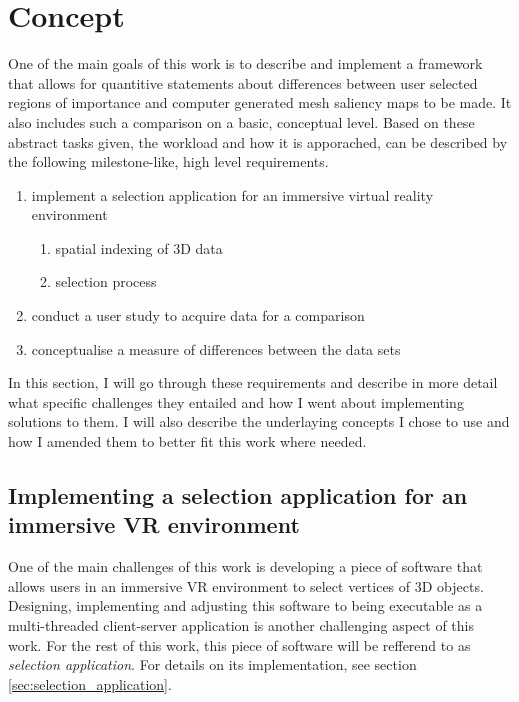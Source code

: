 \chapter{Concept}
\label{sec:concept}

One of the main goals of this work is to describe and implement a framework that allows for quantitive statements about differences between user selected regions of importance and computer generated mesh saliency maps to be made. It also includes such a comparison on a basic, conceptual level. Based on these abstract tasks given, the workload and how it is apporached, can be described by the following milestone-like, high level requirements.

\begin{enumerate}
	\item implement a selection application for an immersive virtual reality environment
	\begin{enumerate}
		\item spatial indexing of 3D data
		\item selection process
	\end{enumerate}
	\item conduct a user study to acquire data for a comparison
	\item conceptualise a measure of differences between the data sets
\end{enumerate}

In this section, I will go through these requirements and describe in more detail what specific challenges they entailed and how I went about implementing solutions to them. I will also describe the underlaying concepts I chose to use and how I amended them to better fit this work where needed.

	\section {Implementing a selection application for an immersive VR environment}
	\label{sec:implementing_selection_application_v2c}
One of the main challenges of this work is developing a piece of software that allows users in an immersive VR environment to select vertices of 3D objects. Designing, implementing and adjusting this software to being executable as a multi-threaded client-server application is another challenging aspect of this work. For the rest of this work, this piece of software will be refferend to as \textit{selection application}. For details on its implementation, see section \ref{sec:selection_application}.

